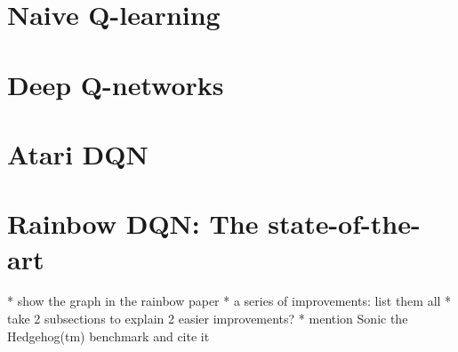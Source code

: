 \section{Naive Q-learning}

\section{Deep Q-networks}

\section{Atari DQN}

\section{Rainbow DQN: The state-of-the-art}
* show the graph in the rainbow paper
* a series of improvements: list them all
* take 2 subsections to explain 2 easier improvements?
* mention Sonic the Hedgehog(tm) benchmark and cite it
